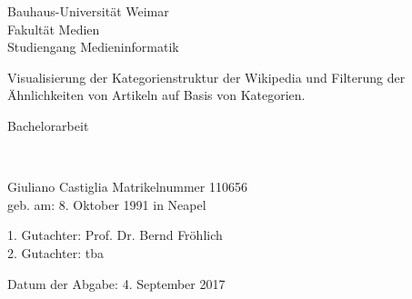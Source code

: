 \captionsetup{subrefformat=bold}

\usetikzlibrary{arrows.meta, babel, decorations.pathreplacing, matrix}
\usepackage{tikz-uml}
\pgfplotsset{width=10cm,compat=1.9}


\hypersetup{hidelinks}




\pagestyle{empty}

\clearscrheadings\clearscrplain

\begin{flushleft}
\begin{normalsize}
Bauhaus-Universität Weimar\\
Fakultät Medien \\
Studiengang Medieninformatik
\vspace{3mm}
\end{normalsize}
\end{flushleft}

\begin{center}
\vspace{20mm}
\begin{LARGE}
Visualisierung der Kategorienstruktur der Wikipedia und Filterung der Ähnlichkeiten von Artikeln auf Basis von Kategorien.\\
\end{LARGE}
\vspace{20mm}
\begin{LARGE}
Bachelorarbeit
\end{LARGE}\\
\vspace{0.4cm}
\vspace{2 cm}

\vspace{1 cm}
\begin{flushleft}Giuliano Castiglia \hfill Matrikelnummer 110656\\
geb. am: 8. Oktober 1991 in Neapel
\end{flushleft}

\vspace{0.5 cm}

\begin{flushleft}
1. Gutachter: Prof. Dr. Bernd Fröhlich\\
2. Gutachter: tba\\
\end{flushleft}

\vspace{1.5cm}
\begin{flushleft}
Datum der Abgabe: 4. September 2017
\end{flushleft}
\end{center}
\clearpage
\pagestyle{useheadings} %
\renewcommand*\contentsname{Table of Contents}

